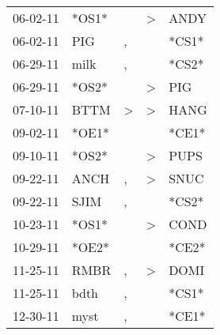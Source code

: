 \begin{supertabular}{p{0.07\textwidth}p{0.06\textwidth}p{0.02\textwidth}p{0.02\textwidth}p{0.06\textwidth}}
          06-02-11\textsuperscript{} &                            *OS1* &                  &     \textgreater &           ANDY\textsuperscript{} \\
          06-02-11\textsuperscript{} &            PIG\textsuperscript{} &                , &                  &                            *CS1* \\
          06-29-11\textsuperscript{} &           milk\textsuperscript{} &                , &                  &                            *CS2* \\
          06-29-11\textsuperscript{} &                            *OS2* &                  &     \textgreater &            PIG\textsuperscript{} \\
          07-10-11\textsuperscript{} &           BTTM\textsuperscript{} &     \textgreater &     \textgreater &           HANG\textsuperscript{} \\
          09-02-11\textsuperscript{} &                            *OE1* &                  &                  &                            *CE1* \\
          09-10-11\textsuperscript{} &                            *OS2* &                  &     \textgreater &           PUPS\textsuperscript{} \\
          09-22-11\textsuperscript{} &           ANCH\textsuperscript{} &                , &     \textgreater &           SNUC\textsuperscript{} \\
          09-22-11\textsuperscript{} &           SJIM\textsuperscript{} &                , &                  &                            *CS2* \\
          10-23-11\textsuperscript{} &                            *OS1* &                  &     \textgreater &           COND\textsuperscript{} \\
          10-29-11\textsuperscript{} &                            *OE2* &                  &                  &                            *CE2* \\
          11-25-11\textsuperscript{} &           RMBR\textsuperscript{} &                , &     \textgreater &           DOMI\textsuperscript{} \\
          11-25-11\textsuperscript{} &           bdth\textsuperscript{} &                , &                  &                            *CS1* \\
          12-30-11\textsuperscript{} &           myst\textsuperscript{} &                , &                  &                            *CE1* \\

\end{supertabular}
